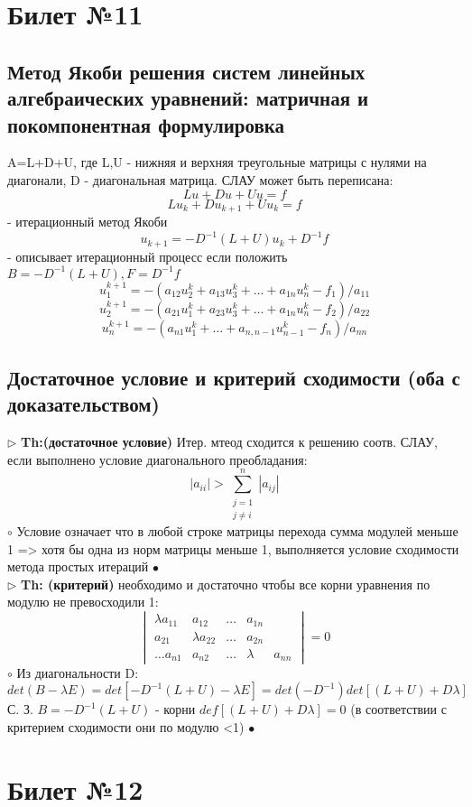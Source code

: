 \documentclass[a4paper]{article}
\begin{document}
\section{Билет №11}
\subsection{Метод Якоби решения систем линейных алгебраических уравнений: матричная и покомпонентная формулировка}
A=L+D+U, где L,U - нижняя и верхняя треугольные матрицы с нулями на диагонали, D - диагональная матрица. СЛАУ может быть переписана:
$$ Lu + Du + Uu = f$$
$$ Lu_k + Du_{k+1} + Uu_k =f$$ - итерационный метод Якоби
$$ u_{k+1} = -D^{-1}(L+U)u_k + D^{-1}f$$ - описывает итерационный процесс если положить $ B=-D^{-1}(L+U), F=D^{-1}f$
$$ u_1^{k+1}=-(a_{12}u_2^k + a_{13}u_3^k + \ldots + a_{1n}u_n^k - f_1)/a_{11}$$
$$ u_2^{k+1}=-(a_{21}u_1^k + a_{23}u_3^k + \ldots + a_{1n}u_n^k - f_2)/a_{22}$$
$$ u_n^{k+1}=-(a_{n1}u_1^k + \ldots + a_{n,n-1}u_{n-1}^k - f_n)/a_{nn} $$
\subsection{Достаточное условие и критерий сходимости (оба с доказательством)}
$\triangleright$ \textbf{Th:(достаточное условие)} Итер. мтеод сходится к решению соотв. СЛАУ, если выполнено условие диагонального преобладания:
$$ |a_{ii}| > \sum_{\substack{j=1 \\ j \neq i}}^n |a_{ij}|$$
	$\circ$ 
		Условие означает что в любой строке матрицы перехода сумма модулей меньше 1 => хотя бы одна из норм матрицы меньше 1, выполняется условие сходимости метода простых итераций 
	$\bullet$ \\

$\triangleright$ \textbf{Th: (критерий)} необходимо и достаточно чтобы все корни уравнения по модулю не превосходили 1:
$$ \begin{vmatrix} 
\lambda a_{11} & a_{12} & \ldots & a_{1n} \\
a_{21} & \lambda a_{22} & \ldots & a_{2n} \\
\ldots
a_{n1} & a_{n2} & \ldots & \lambda & a_{nn}
\end{vmatrix} = 0 $$
	$\circ$ 
		Из диагональности D:
		$$ det(B-\lambda E) = det[-D^{-1}(L+U) - \lambda E] = det(-D^{-1}) det[(L+U) + D\lambda] $$
		С. З. $B=-D^{-1}(L+U)$ - корни $def[(L+U)+D\lambda]=0$ (в соответствии с критерием сходимости они по модулю <1)
	$\bullet$

\section{Билет №12}
\end{document}
